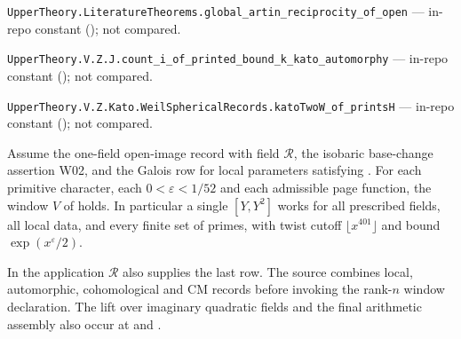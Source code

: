 \noindent\nolinkurl{UpperTheory.LiteratureTheorems.global_artin_reciprocity_of_open} --- in-repo constant (); not compared.\par
\noindent\nolinkurl{UpperTheory.V.Z.J.count_i_of_printed_bound_k_kato_automorphy} --- in-repo constant (); not compared.\par
\noindent\nolinkurl{UpperTheory.V.Z.Kato.WeilSphericalRecords.katoTwoW_of_printsH} --- in-repo constant (); not compared.\par

\begin{formalstatement}\label{sub:W01}
Assume the one-field open-image record with field $\mathcal R$, the
isobaric base-change assertion W02, and the Galois row for local
parameters satisfying . For each primitive character, each
$0<\varepsilon<1/52$ and each admissible page function, the window $V$
of  holds. In particular a single $[Y,Y^2]$ works for all
prescribed fields, all local data, and every finite set of primes, with
twist cutoff $\lfloor x^{401}\rfloor$ and bound $\exp(x^\varepsilon/2)$.
\end{formalstatement}
In the application $\mathcal R$ also supplies the last row. The source
combines local, automorphic, cohomological and CM records before invoking
the rank-$n$ window declaration. The lift over imaginary quadratic fields
and the final arithmetic assembly also occur at  and
.

